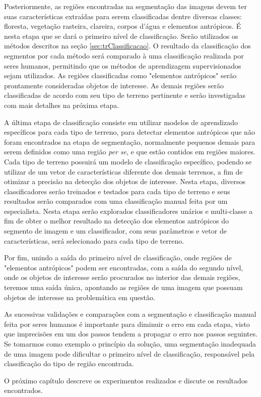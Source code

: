 Posteriormente, as regiões encontradas na segmentação das imagens devem ter suas características extraídas para serem classificadas dentre diversas classes: floresta, vegetação rasteira, clareira, corpos d'água e elementos antrópicos. É nesta etapa que se dará o primeiro nível de classificação. Serão utilizados os métodos descritos na seção \ref{sec:trClassificacao}. O resultado da classificação dos segmentos por cada método será comparado à uma classificação realizada por seres humanos, permitindo que os métodos de aprendizagem supervisionados sejam utilizados. As regiões classificadas como "elementos antrópicos" serão prontamente consideradas objetos de interesse. As demais regiões serão classificadas de acordo com seu tipo de terreno pertinente e serão investigadas com mais detalhes na próxima etapa.

A última etapa de classificação consiste em utilizar modelos de aprendizado específicos para cada tipo de terreno, para detectar elementos antrópicos que não foram encontrados na etapa de segmentação, normalmente pequenos demais para serem definidos como uma região \textit{per se}, e que estão contidos em regiões maiores. Cada tipo de terreno possuirá um modelo de classificação específico, podendo se utilizar de um vetor de características diferente dos demais terrenos, a fim de otimizar a precisão na detecção dos objetos de interesse. Nesta etapa, diversos classificadores serão treinados e testados para cada tipo de terreno e seus resultados serão comparados com uma classificação manual feita por um especialista. Nesta etapa serão explorados classificadores unários e multi-classe a fim de obter o melhor resultado na detecção dos elementos antrópicos do segmento de imagem e um classificador, com seus parâmetros e vetor de características, será selecionado para cada tipo de terreno.

Por fim, unindo a saída do primeiro nível de classificação, onde regiões de "elementos antrópicos" podem ser encontradas, com a saída do segundo nível, onde os objetos de interesse serão procurados no interior das demais regiões, teremos uma saída única, apontando as regiões de uma imagem que possuam objetos de interesse na problemática em questão.

As sucessivas validações e comparações com a segmentação e classificação manual feita por seres humanos é importante para diminuir o erro em cada etapa, visto que imprecisões em um dos passos tendem a propagar o erro nos passos seguintes. Se tomarmos como exemplo o princípio da solução, uma segmentação inadequada de uma imagem pode dificultar o primeiro nível de classificação, responsável pela classificação do tipo de região encontrada.

O próximo capítulo descreve os experimentos realizados e discute os resultados encontrados.